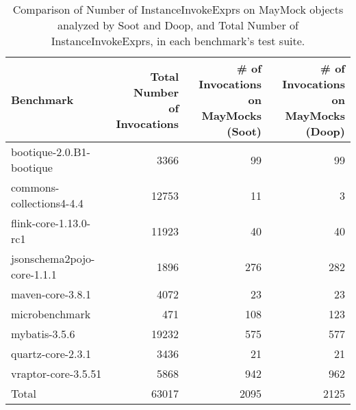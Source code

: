 \begin{table*}
	\centering
	\caption{Comparison of Number of InstanceInvokeExprs on MayMock objects analyzed by Soot and Doop, and Total Number of InstanceInvokeExprs, in each benchmark's test suite.}
	\begin{tabular}{lrrr}
		\toprule
		Benchmark & \thead{Total Number \\ of Invocations} & \thead{\# of Invocations \\ on MayMocks (Soot)} & \thead{\# of Invocations \\ on MayMocks (Doop)} \\
		\midrule
		bootique-2.0.B1-bootique           		&  3366     &  99  & 99  \\
		commons-collections4-4.4       			&  12753    &  11  & 3  \\
		flink-core-1.13.0-rc1           		&  11923    &  40  & 40  \\
		jsonschema2pojo-core-1.1.1           	&  1896     &  276  & 282  \\
		maven-core-3.8.1           				&  4072     &  23   & 23  \\
		microbenchmark         		  			&  471      &  108  & 123      \\
		mybatis-3.5.6         		  			&  19232    &  575  & 577       \\
		quartz-core-2.3.1       	  			&  3436     &  21   & 21    \\
		vraptor-core-3.5.51        	  			&  5868     &  942  & 962    \\
		\bottomrule
		Total        	  						&  63017    & 2095  & 2125    \\
	\end{tabular}
	\label{tab:invokes}
\end{table*}

